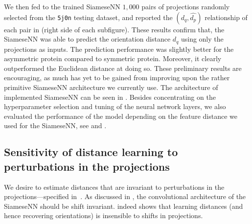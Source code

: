 We then fed to the trained SiameseNN $1,000$ pairs of projections randomly selected from the \texttt{5j0n} testing dataset, and reported the $(d_q,\widehat{d_p})$ relationship of each pair in  (right side of each subfigure).
These results confirm that, the SiameseNN was able to predict the orientation distance $d_q$ using only the projections as inputs.
The prediction performance was slightly better for the asymmetric protein compared to symmetric protein.
Moreover, it clearly outperformed the Euclidean distance at doing so.
These preliminary results are encouraging, as much has yet to be gained from improving upon the rather primitive SiameseNN architecture we currently use.
The architecture of implemented SiameseNN can be seen in .
Besides concentrating on the hyperparameter selection and tuning of the neural network layers, we also evaluated the performance of the model depending on the feature distance we used for the SiameseNN, see  and .


\subsection{Sensitivity of distance learning to perturbations in the projections}\label{sec:results:distance-estimation:sensitivity}


We desire to estimate distances that are invariant to perturbations in the projections---specified in~.
As discussed in , the convolutional architecture of the SiameseNN should be shift invariant.
 indeed shows that learning distances (and hence recovering orientations) is insensible to shifts in projections.

